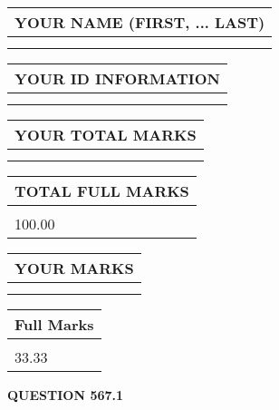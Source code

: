 \documentclass{ctexart}
\begin{document}
   
   
   
\newpage 
\setcounter{page}{ 
   567001 } 
   
   
   
   
\noindent\begin{tabular}{|l|}
\hline
YOUR NAME (FIRST, ... LAST)  \\
\hline
 \\ 
 \\ 
\hline
\end{tabular}
\hspace{0.05in} \begin{tabular}{|l|}
\hline
 YOUR   ID   INFORMATION  \\
\hline
 \\ 
 \\ 
\hline
\end{tabular}
   
   
\vspace{0.2in}\noindent\begin{tabular}{|l|}
\hline
YOUR TOTAL MARKS  \\
\hline
 \\ 
 \\ 
\hline
\end{tabular}
\hspace{0.05in} \begin{tabular}{|l|}
\hline
TOTAL FULL MARKS  \\
\hline
 \\ 
100.00 \\
\hline
\end{tabular}
   
   
 \vspace{0.2in}
 
 
 
 
   
   
  
\vspace{0.2in}
  
\noindent\begin{tabular}{|l|}
\hline
 YOUR MARKS  \\
\hline
 \\ 
 \\ 
\hline
\end{tabular}
\hspace{0.05in} \begin{tabular}{|l|}
\hline
 Full Marks  \\
\hline
 \\ 
33.33 \\
\hline
\end{tabular}
{\textbf{\Large{QUESTION
567.1 
}}}
  
\end{document}
